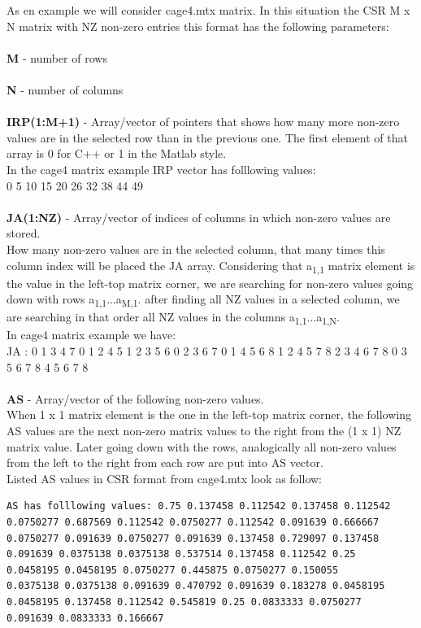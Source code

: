 \documentclass{scrreprt}
\begin{document}
 As en example we will consider cage4.mtx matrix. In this situation the CSR M x N matrix with NZ non-zero entries this format has the following parameters:
\\
\\
\textbf{ M} - number of rows
 \\
 \\
\textbf{ N} - number of columns
 \\
 \\
 \textbf{IRP(1:M+1)} - Array/vector of pointers that shows how many more non-zero values are in the selected row than in the previous one. The first element of that array is 0 for C++ or 1 in the Matlab style. \\
In the cage4 matrix example IRP vector has folllowing values:
\\
0 5 10 15 20 26 32 38 44 49 
\\
\\
\textbf{JA(1:NZ)} - Array/vector of indices of columns in which non-zero values are stored. 
\\
How many non-zero values are in the selected column, that many times this column index will be placed the JA array. Considering that a\textsubscript{1,1} matrix element is the value in the left-top matrix corner, we are searching for non-zero values going down with rows a\textsubscript{1,1}...a\textsubscript{M,1}. after finding all NZ values in a selected column, we are searching in that order all NZ values in the columns a\textsubscript{1,1}...a\textsubscript{1,N}. \\


In cage4 matrix example we have:
\\
JA : 0 1 3 4 7 0 1 2 4 5 1 2 3 5 6 0 2 3 6 7 0 1 4 5 6 8 1 2 4 5 7 8 2 3 4 6 7 8 0 3 5 6 7 8 4 5 6 7 8 
\\
\\
\textbf{AS} - Array/vector of the following non-zero values. 
\\
When 1 x 1 matrix element is the one in the left-top matrix corner, the following AS values are the next non-zero matrix values to the right from the (1 x 1) NZ matrix value. Later going down with the rows, analogically all non-zero values from the left to the right from each row are put into AS vector.
\\
Listed AS values in CSR format from cage4.mtx look as follow:
\begin{lstlisting}[language=TeX]
AS has folllowing values: 0.75 0.137458 0.112542 0.137458 0.112542 
0.0750277 0.687569 0.112542 0.0750277 0.112542 0.091639 0.666667 
0.0750277 0.091639 0.0750277 0.091639 0.137458 0.729097 0.137458
0.091639 0.0375138 0.0375138 0.537514 0.137458 0.112542 0.25
0.0458195 0.0458195 0.0750277 0.445875 0.0750277 0.150055 
0.0375138 0.0375138 0.091639 0.470792 0.091639 0.183278 0.0458195 
0.0458195 0.137458 0.112542 0.545819 0.25 0.0833333 0.0750277
0.091639 0.0833333 0.166667 
\end{lstlisting}
\end{document}
